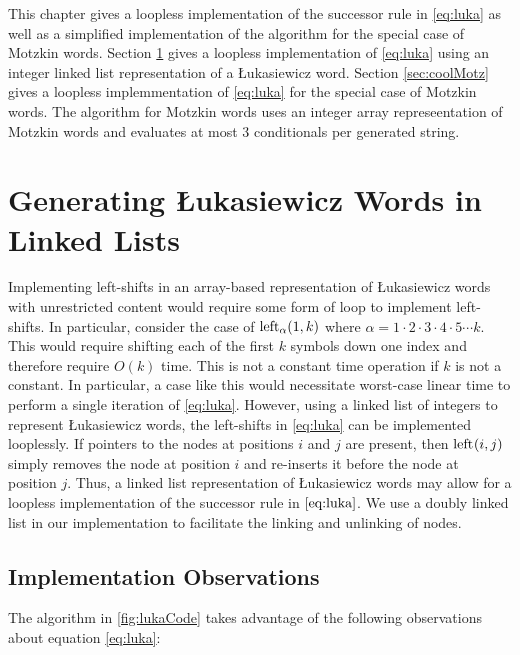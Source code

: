 This chapter gives a loopless implementation of the successor rule in \eqref{eq:luka} as well as a simplified implementation of the algorithm for the special case of Motzkin words. Section \ref{sec:luka_ll} gives a loopless implementation of \eqref{eq:luka} using an integer linked list representation of a Łukasiewicz word. Section \ref{sec:coolMotz} gives a loopless implemmentation of \eqref{eq:luka} for the special case of Motzkin words.  The algorithm for Motzkin words uses an integer array represeentation of Motzkin words and evaluates at most 3 conditionals per generated string. 


\section{Generating Łukasiewicz Words in Linked Lists}\label{sec:luka_ll}
Implementing left-shifts in an array-based representation of Łukasiewicz words with unrestricted content would require some form of loop to implement left-shifts.  In particular, consider the case of $\lshiftindex[\alpha]{1}{k}$ where $\alpha=1\cdot2\cdot3\cdot4\cdot5\cdots k$.  This would require shifting each of the first $k$ symbols down one index and therefore require $O(k)$ time.  This is not a constant time operation if $k$ is not a constant.  In particular, a case like this would necessitate worst-case linear time to perform a single iteration of \eqref{eq:luka}.
However, using a linked list of integers to represent Łukasiewicz words, the left-shifts in \eqref{eq:luka} can be implemented looplessly.  If pointers to the nodes at positions $i$ and $j$ are present, then $\lshiftindex{i}{j}$ simply removes the node at position $i$ and re-inserts it before the node at position $j$.  Thus, a linked list representation of Łukasiewicz words may allow for a loopless implementation of the successor rule in $\eqref{eq:luka}$.  We use a doubly linked list in our implementation to facilitate the linking and unlinking of nodes.

\subsection{Implementation Observations}
The algorithm in \ref{fig:lukaCode} takes advantage of the following observations about equation \eqref{eq:luka}:


